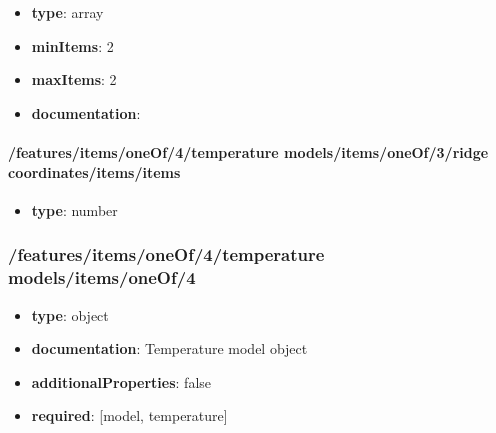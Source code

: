 \begin{itemize}\item {\bf type}: array
\item {\bf minItems}: 2
\item {\bf maxItems}: 2
\item {\bf documentation}: 
\end{itemize}\paragraph{/features/items/oneOf/4/temperature models/items/oneOf/3/ridge coordinates/items/items}
\begin{itemize}\item {\bf type}: number
\end{itemize}\subsubsection{/features/items/oneOf/4/temperature models/items/oneOf/4}
\begin{itemize}\item {\bf type}: object
\item {\bf documentation}: Temperature model object
\item {\bf additionalProperties}: false
\item {\bf required}: [model, temperature]\end{itemize}
